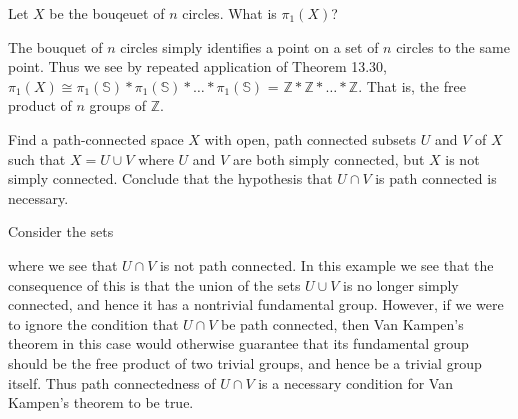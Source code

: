\documentclass[a4paper,12pt,twoside]{hmcpset}
\begin{document}
\begin{exercise}[Exercise 13.41]
     Let $X$ be the bouqeuet of $n$ circles. What
is $\pi_1(X)$?
\end{exercise}

\begin{solution}
The bouquet of $n$ circles simply identifies a point on a set of $n$
circles to the same point. Thus we see by repeated application of
Theorem 13.30, $\pi_1(X) \cong
\pi_1(\mathbb{S})*\pi_1(\mathbb{S})*\dots*\pi_1(\mathbb{S})$ 
= $\mathbb{Z}*\mathbb{Z}*\dots*\mathbb{Z}$. That is, the free product
of $n$ groups of $\mathbb{Z}$.
\end{solution}

\begin{exercise}[Exercise 13.32]
    Find a path-connected space $X$ with open,
path connected subsets $U$ and $V$ of $X$ such that $X = U \cup V$
where $U$ and $V$ are both simply connected, but $X$ is not simply
connected. Conclude that the hypothesis that $U \cap V$ is path
connected is necessary. 
\end{exercise}

\begin{solution}
Consider the sets 
\begin{figure}[h!]
    \centering
\end{figure}

where we see that $U \cap V$ is not path connected. In this example we
see that the consequence of this is that the union of the sets $U \cup
V$ is no longer simply connected, and hence it has a nontrivial
fundamental group. However, if we were to ignore the condition that
$U \cap V$ be path connected, then Van Kampen's
theorem in this case would otherwise guarantee that its fundamental
group should be the free product of two trivial groups, and hence be a
trivial group itself. Thus path connectedness of $U \cap V$ is a
necessary condition for Van Kampen's theorem to be true.
\end{solution}
\end{document}

